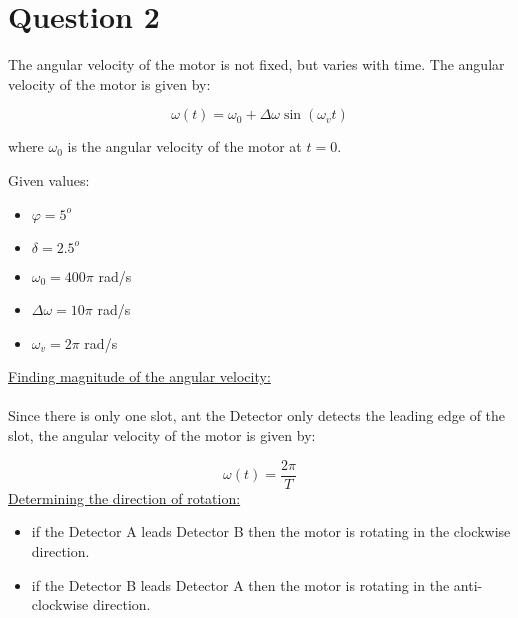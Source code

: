 \documentclass{article}
\begin{document}
\section*{Question 2}
The angular velocity of the motor is not fixed, but varies with time. 
The angular velocity of the motor is given by:

\begin{equation*}
\omega(t) = \omega_0 + \Delta \omega \sin(\omega_v t)
\end{equation*}

where $\omega_0$ is the angular velocity of the motor at $t=0$.

Given values:

\begin{itemize}
\item $\varphi  = 5^o$ 
\item $\delta = 2.5^o$
\item $\omega_0 = 400 \pi$ rad/s
\item $\Delta \omega = 10 \pi$ rad/s
\item $\omega_v = 2 \pi$ rad/s
\end{itemize}
\underline{Finding magnitude of the angular velocity:}\\
\\
Since there is only one slot, ant the Detector only detects the leading edge of the slot, the angular velocity of the motor is given by:

\begin{equation*}
\omega(t) = \frac{2\pi}{T} 
\end{equation*}
\underline{Determining the direction of rotation:}

\begin{itemize}
    \item if the Detector A leads Detector B then the motor is rotating in the clockwise direction.
    \item if the Detector B leads Detector A then the motor is rotating in the anti-clockwise direction.
\end{itemize}
\end{document}
